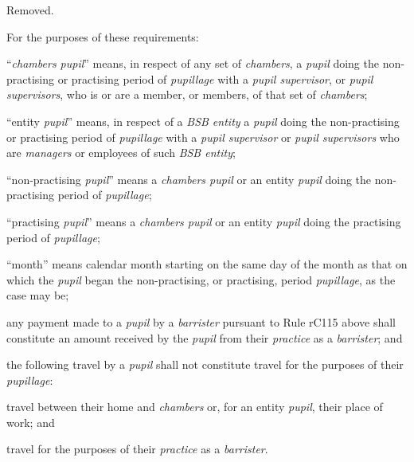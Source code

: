 
Removed.


For the purposes of these requirements:
\begin{numlist}\item ``\emph{chambers pupil}'' means, in respect of any set of
\emph{chambers}, a \emph{pupil} doing the non-practising or practising
period of \emph{pupillage} with a \emph{pupil supervisor}, or
\emph{pupil supervisors}, who is or are a member, or members, of that
set of \emph{chambers};
\item ``entity \emph{pupil}'' means, in respect of a \emph{BSB entity} a
\emph{pupil} doing the non-practising or practising period of
\emph{pupillage} with a \emph{pupil supervisor} or \emph{pupil
supervisors} who are \emph{managers} or employees of such \emph{BSB
entity};
\item ``non-practising \emph{pupil}'' means a \emph{chambers pupil} or an
entity \emph{pupil} doing the non-practising period of \emph{pupillage};
\item ``practising \emph{pupil}'' means a \emph{chambers pupil} or an
entity \emph{pupil} doing the practising period of \emph{pupillage};
\item ``month'' means calendar month starting on the same day of the month
as that on which the \emph{pupil} began the non-practising, or
practising, period \emph{pupillage}, as the case may be;
\item any payment made to a \emph{pupil} by a \emph{barrister} pursuant to
Rule rC115 above shall constitute an amount received by the \emph{pupil}
from their \emph{practice} as a \emph{barrister}; and
\item the following travel by a \emph{pupil} shall not constitute travel
for the purposes of their \emph{pupillage}:
\begin{alphlist}\item travel between their home and \emph{chambers} or, for an entity
\emph{pupil}, their place of work; and
\item travel for the purposes of their \emph{practice} as a
\emph{barrister}.\end{alphlist}\end{numlist}






